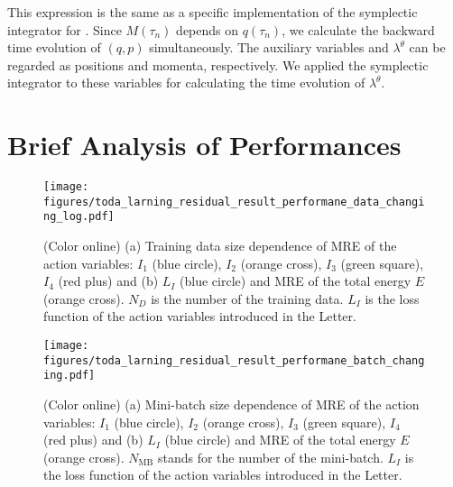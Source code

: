 This expression is the same as a specific implementation of the symplectic integrator for .
Since $M(\tau_n)$ depends on $q(\tau_{n})$, we calculate the backward time evolution of $(q,p)$ simultaneously.
The auxiliary variables and $\lambda^{\theta}$ can be regarded as positions and momenta, respectively.
We applied the symplectic integrator to these variables for calculating the time evolution of $\lambda^{\theta}$.

\section{Brief Analysis of Performances}
\begin{figure}[t]
  \centering
  \texttt{[image: figures/toda\_larning\_residual\_result\_performane\_data\_changing\_log.pdf]}
  \caption{
    (Color online) (a) Training data size dependence of MRE of the action variables: $I_1$ (blue circle), $I_2$ (orange cross), $I_3$ (green square), $I_4$ (red plus) and (b) $L_I$ (blue circle) and MRE of the total energy $E$ (orange cross).
    $N_D$ is the number of the training data.
    $L_I$ is the loss function of the action variables introduced in the Letter.
    }
  \label{fig:toda_larning_residual_result_performance_data_changing}
\end{figure}
\begin{figure}[tp]
  \centering
  \texttt{[image: figures/toda\_larning\_residual\_result\_performane\_batch\_changing.pdf]}
  \caption{
    (Color online) (a) Mini-batch size dependence of MRE of the action variables: $I_1$ (blue circle), $I_2$ (orange cross), $I_3$ (green square), $I_4$ (red plus) and (b) $L_I$ (blue circle) and MRE of the total energy $E$ (orange cross).
    $N_{\mathrm{MB}}$ stands for the number of the mini-batch.
    $L_I$ is the loss function of the action variables introduced in the Letter.
  }
  \label{fig:toda_larning_residual_result_performance_batch_changing}
\end{figure}

